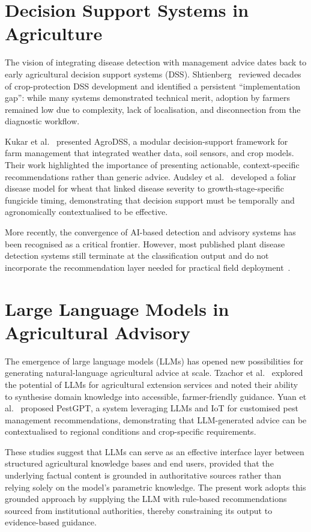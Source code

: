 \documentclass[12pt,a4paper]{report}
\begin{document}
\section{Decision Support Systems in Agriculture}
The vision of integrating disease detection with management advice dates back to early agricultural decision support systems (DSS). Shtienberg~\cite{b19} reviewed decades of crop-protection DSS development and identified a persistent ``implementation gap'': while many systems demonstrated technical merit, adoption by farmers remained low due to complexity, lack of localisation, and disconnection from the diagnostic workflow.

Kukar et al.~\cite{b20} presented AgroDSS, a modular decision-support framework for farm management that integrated weather data, soil sensors, and crop models. Their work highlighted the importance of presenting actionable, context-specific recommendations rather than generic advice. Audsley et al.~\cite{b24} developed a foliar disease model for wheat that linked disease severity to growth-stage-specific fungicide timing, demonstrating that decision support must be temporally and agronomically contextualised to be effective.

More recently, the convergence of AI-based detection and advisory systems has been recognised as a critical frontier. However, most published plant disease detection systems still terminate at the classification output and do not incorporate the recommendation layer needed for practical field deployment~\cite{b9,b19}.

\section{Large Language Models in Agricultural Advisory}
The emergence of large language models (LLMs) has opened new possibilities for generating natural-language agricultural advice at scale. Tzachor et al.~\cite{b10} explored the potential of LLMs for agricultural extension services and noted their ability to synthesise domain knowledge into accessible, farmer-friendly guidance. Yuan et al.~\cite{b25} proposed PestGPT, a system leveraging LLMs and IoT for customised pest management recommendations, demonstrating that LLM-generated advice can be contextualised to regional conditions and crop-specific requirements.

These studies suggest that LLMs can serve as an effective interface layer between structured agricultural knowledge bases and end users, provided that the underlying factual content is grounded in authoritative sources rather than relying solely on the model's parametric knowledge. The present work adopts this grounded approach by supplying the LLM with rule-based recommendations sourced from institutional authorities, thereby constraining its output to evidence-based guidance.
\end{document}
